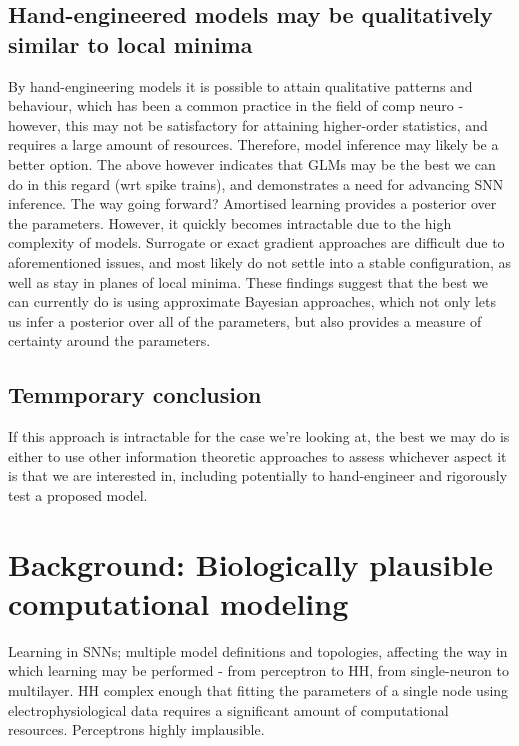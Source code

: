 \documentclass[mphil,deptreport,ai]{infthesis} %
\begin{document}
\section{Hand-engineered models may be qualitatively similar to local minima}
By hand-engineering models it is possible to attain qualitative patterns and behaviour, which has been a common practice in the field of comp neuro - however, this may not be satisfactory for attaining higher-order statistics, and requires a large amount of resources. Therefore, model inference may likely be a better option. 
The above however indicates that GLMs may be the best we can do in this regard (wrt spike trains), and demonstrates a need for advancing SNN inference.
The way going forward?
Amortised learning provides a posterior over the parameters.
However, it quickly becomes intractable due to the high complexity of models.
Surrogate or exact gradient approaches are difficult due to aforementioned issues, and most likely do not settle into a stable configuration, as well as stay in planes of local minima.
These findings suggest that the best we can currently do is using approximate Bayesian approaches, which not only lets us infer a posterior over all of the parameters, but also provides a measure of certainty around the parameters.

\section{Temmporary conclusion}
If this approach is intractable for the case we’re looking at, the best we may do is either to use other information theoretic approaches to assess whichever aspect it is that we are interested in, including potentially to hand-engineer and rigorously test a proposed model.


\chapter{Background: Biologically plausible computational modeling}

Learning in SNNs; multiple model definitions and topologies, affecting the way in which learning may be performed - from perceptron to HH, from single-neuron to multilayer.
HH complex enough that fitting the parameters of a single node using electrophysiological data requires a significant amount of computational resources.
Perceptrons highly implausible.
\end{document}
